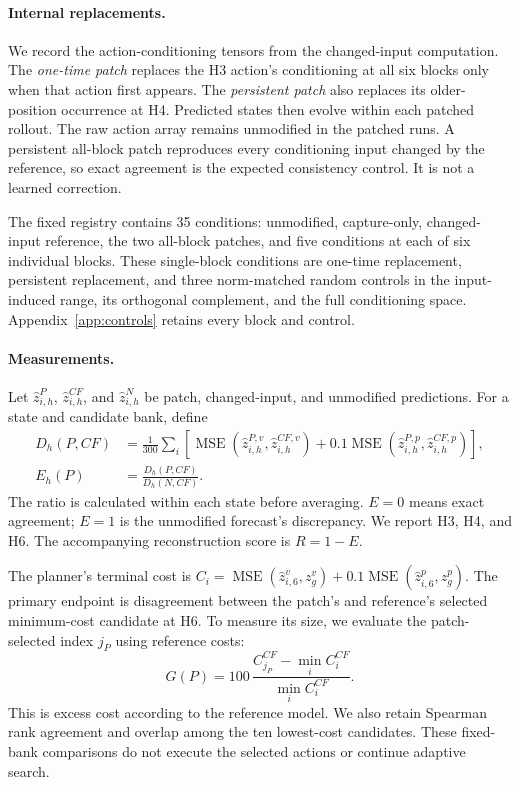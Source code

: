 \documentclass{article}
\newcommand{\MSE}{\operatorname{MSE}}
\begin{document}
\paragraph{Internal replacements.}
We record the action-conditioning tensors from the changed-input computation. The \emph{one-time patch} replaces the H3 action's conditioning at all six blocks only when that action first appears. The \emph{persistent patch} also replaces its older-position occurrence at H4. Predicted states then evolve within each patched rollout. The raw action array remains unmodified in the patched runs. A persistent all-block patch reproduces every conditioning input changed by the reference, so exact agreement is the expected consistency control. It is not a learned correction.

The fixed registry contains 35 conditions: unmodified, capture-only, changed-input reference, the two all-block patches, and five conditions at each of six individual blocks. These single-block conditions are one-time replacement, persistent replacement, and three norm-matched random controls in the input-induced range, its orthogonal complement, and the full conditioning space. Appendix~\ref{app:controls} retains every block and control.

\paragraph{Measurements.}
Let $\hat z^{P}_{i,h}$, $\hat z^{CF}_{i,h}$, and $\hat z^{N}_{i,h}$ be patch, changed-input, and unmodified predictions. For a state and candidate bank, define
\begin{equation}
 \begin{aligned}
 D_h(P,CF)&=\frac{1}{300}\sum_i\left[\MSE(\hat z^{P,v}_{i,h},\hat z^{CF,v}_{i,h})+0.1\MSE(\hat z^{P,p}_{i,h},\hat z^{CF,p}_{i,h})\right],\\
 E_h(P)&=\frac{D_h(P,CF)}{D_h(N,CF)}.
 \end{aligned}
 \label{eq:distance}
\end{equation}
The ratio is calculated within each state before averaging. $E=0$ means exact agreement; $E=1$ is the unmodified forecast's discrepancy. We report H3, H4, and H6. The accompanying reconstruction score is $R=1-E$.

The planner's terminal cost is $C_i=\MSE(\hat z^v_{i,6},z_g^v)+0.1\MSE(\hat z^p_{i,6},z_g^p)$. The primary endpoint is disagreement between the patch's and reference's selected minimum-cost candidate at H6. To measure its size, we evaluate the patch-selected index $j_P$ using reference costs:
\begin{equation}
 G(P)=100\,\frac{C^{CF}_{j_P}-\min_i C^{CF}_i}{\min_i C^{CF}_i}.
 \label{eq:cost}
\end{equation}
This is excess cost according to the reference model. We also retain Spearman rank agreement and overlap among the ten lowest-cost candidates. These fixed-bank comparisons do not execute the selected actions or continue adaptive search.
\end{document}
